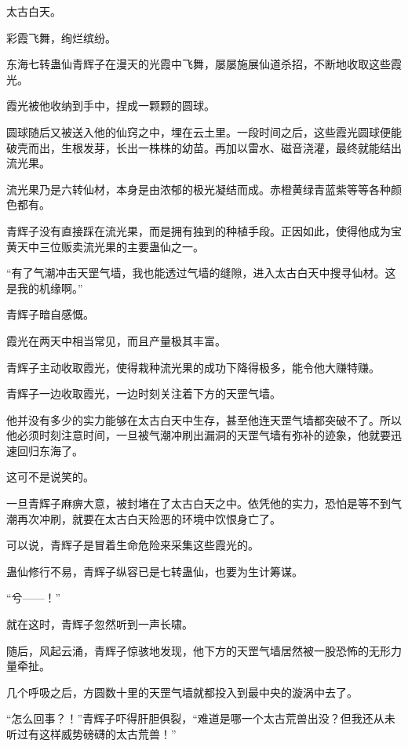 
\begin{this_body}



太古白天。

彩霞飞舞，绚烂缤纷。

东海七转蛊仙青辉子在漫天的光霞中飞舞，屡屡施展仙道杀招，不断地收取这些霞光。

霞光被他收纳到手中，捏成一颗颗的圆球。

圆球随后又被送入他的仙窍之中，埋在云土里。一段时间之后，这些霞光圆球便能破壳而出，生根发芽，长出一株株的幼苗。再加以雷水、磁音浇灌，最终就能结出流光果。

流光果乃是六转仙材，本身是由浓郁的极光凝结而成。赤橙黄绿青蓝紫等等各种颜色都有。

青辉子没有直接踩在流光果，而是拥有独到的种植手段。正因如此，使得他成为宝黄天中三位贩卖流光果的主要蛊仙之一。

“有了气潮冲击天罡气墙，我也能透过气墙的缝隙，进入太古白天中搜寻仙材。这是我的机缘啊。”

青辉子暗自感慨。

霞光在两天中相当常见，而且产量极其丰富。

青辉子主动收取霞光，使得栽种流光果的成功下降得极多，能令他大赚特赚。

青辉子一边收取霞光，一边时刻关注着下方的天罡气墙。

他并没有多少的实力能够在太古白天中生存，甚至他连天罡气墙都突破不了。所以他必须时刻注意时间，一旦被气潮冲刷出漏洞的天罡气墙有弥补的迹象，他就要迅速回归东海了。

这可不是说笑的。

一旦青辉子麻痹大意，被封堵在了太古白天之中。依凭他的实力，恐怕是等不到气潮再次冲刷，就要在太古白天险恶的环境中饮恨身亡了。

可以说，青辉子是冒着生命危险来采集这些霞光的。

蛊仙修行不易，青辉子纵容已是七转蛊仙，也要为生计筹谋。

“兮——！”

就在这时，青辉子忽然听到一声长啸。

随后，风起云涌，青辉子惊骇地发现，他下方的天罡气墙居然被一股恐怖的无形力量牵扯。

几个呼吸之后，方圆数十里的天罡气墙就都投入到最中央的漩涡中去了。

“怎么回事？！”青辉子吓得肝胆俱裂，“难道是哪一个太古荒兽出没？但我还从未听过有这样威势磅礴的太古荒兽！”


\end{this_body}
